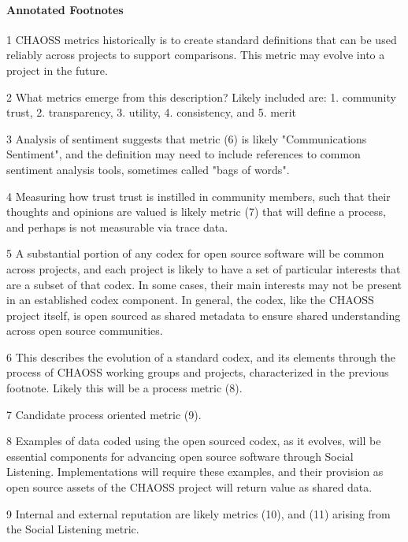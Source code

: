 \hypertarget{annotated-footnotes}{%
\paragraph{Annotated Footnotes}\label{annotated-footnotes}}

1 CHAOSS metrics historically is to create standard definitions that can
be used reliably across projects to support comparisons. This metric may
evolve into a project in the future.

2 What metrics emerge from this description? Likely included are: 1.
community trust, 2. transparency, 3. utility, 4. consistency, and 5.
merit

3 Analysis of sentiment suggests that metric (6) is likely
"Communications Sentiment", and the definition may need to include
references to common sentiment analysis tools, sometimes called "bags of
words".

4 Measuring how trust trust is instilled in community members, such that
their thoughts and opinions are valued is likely metric (7) that will
define a process, and perhaps is not measurable via trace data.

5 A substantial portion of any codex for open source software will be
common across projects, and each project is likely to have a set of
particular interests that are a subset of that codex. In some cases,
their main interests may not be present in an established codex
component. In general, the codex, like the CHAOSS project itself, is
open sourced as shared metadata to ensure shared understanding across
open source communities.

6 This describes the evolution of a standard codex, and its elements
through the process of CHAOSS working groups and projects, characterized
in the previous footnote. Likely this will be a process metric (8).

7 Candidate process oriented metric (9).

8 Examples of data coded using the open sourced codex, as it evolves,
will be essential components for advancing open source software through
Social Listening. Implementations will require these examples, and their
provision as open source assets of the CHAOSS project will return value
as shared data.

9 Internal and external reputation are likely metrics (10), and (11)
arising from the Social Listening metric.
